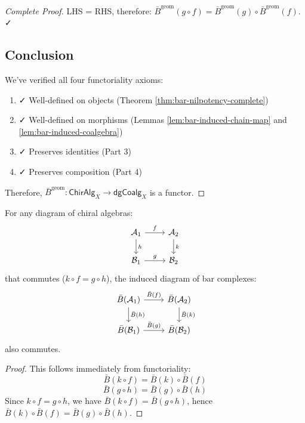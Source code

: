 \begin{proof}[Complete Proof]
LHS = RHS, therefore: $\bar{B}^{\text{geom}}(g \circ f) = \bar{B}^{\text{geom}}(g) \circ \bar{B}^{\text{geom}}(f)$. ✓

\subsection*{Conclusion}

We've verified all four functoriality axioms:
\begin{enumerate}
\item ✓ Well-defined on objects (Theorem \ref{thm:bar-nilpotency-complete})
\item ✓ Well-defined on morphisms (Lemmas \ref{lem:bar-induced-chain-map} and \ref{lem:bar-induced-coalgebra})
\item ✓ Preserves identities (Part 3)
\item ✓ Preserves composition (Part 4)
\end{enumerate}

Therefore, $\bar{B}^{\text{geom}}: \mathsf{ChirAlg}_X \to \mathsf{dgCoalg}_X$ is a functor.
\end{proof}

\begin{corollary}\label{cor:bar-natural}
For any diagram of chiral algebras:
$$
\begin{tikzcd}
\mathcal{A}_1 \arrow[r, "f"] \arrow[d, "h"] & \mathcal{A}_2 \arrow[d, "k"] \\
\mathcal{B}_1 \arrow[r, "g"] & \mathcal{B}_2
\end{tikzcd}
$$
that commutes ($k \circ f = g \circ h$), the induced diagram of bar complexes:
$$
\begin{tikzcd}
\bar{B}(\mathcal{A}_1) \arrow[r, "\bar{B}(f)"] \arrow[d, "\bar{B}(h)"] & \bar{B}(\mathcal{A}_2) \arrow[d, "\bar{B}(k)"] \\
\bar{B}(\mathcal{B}_1) \arrow[r, "\bar{B}(g)"] & \bar{B}(\mathcal{B}_2)
\end{tikzcd}
$$
also commutes.
\end{corollary}

\begin{proof}
This follows immediately from functoriality:
$$\bar{B}(k \circ f) = \bar{B}(k) \circ \bar{B}(f)$$
$$\bar{B}(g \circ h) = \bar{B}(g) \circ \bar{B}(h)$$
Since $k \circ f = g \circ h$, we have $\bar{B}(k \circ f) = \bar{B}(g \circ h)$, hence $\bar{B}(k) \circ \bar{B}(f) = \bar{B}(g) \circ \bar{B}(h)$.
\end{proof}

